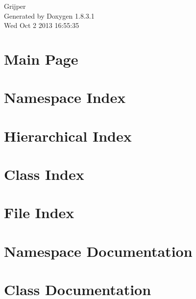 \documentclass{book}
\begin{document}
\begin{titlepage}
\vspace*{7cm}
\begin{center}
{\Large Grijper }\\
\vspace*{1cm}
{\large Generated by Doxygen 1.8.3.1}\\
\vspace*{0.5cm}
{\small Wed Oct 2 2013 16:55:35}\\
\end{center}
\end{titlepage}
\clearemptydoublepage
{}
\tableofcontents
\clearemptydoublepage
{}
\chapter{Main Page}
\label{index}
\chapter{Namespace Index}

\chapter{Hierarchical Index}

\chapter{Class Index}

\chapter{File Index}

\chapter{Namespace Documentation}







\chapter{Class Documentation}









\end{document}
